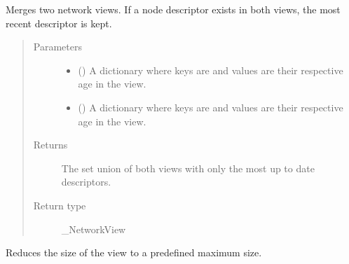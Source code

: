 \documentclass[letterpaper,10pt,english]{sphinxmanual}
\begin{document}
\begin{fulllineitems}
\begin{fulllineitems}
\label{\detokenize{app.domain:app.domain.network_nodes.NewscastNode._merge}}
Merges two network views. If a node descriptor exists in both
views, the most recent descriptor is kept.
\begin{quote}\begin{description}
\item[{Parameters}] \leavevmode\begin{itemize}
\item {} 
 () \textendash{} A dictionary where keys are {\hyperref[\detokenize{app.domain:app.domain.network_nodes.Node}]{}}
and values are their respective age in the view.

\item {} 
 () \textendash{} A dictionary where keys are {\hyperref[\detokenize{app.domain:app.domain.network_nodes.Node}]{}}
and values are their respective age in the view.

\end{itemize}

\item[{Returns}] \leavevmode
The set union of both views with only the most up to date
descriptors.

\item[{Return type}] \leavevmode
\_NetworkView

\end{description}\end{quote}

\end{fulllineitems}


\begin{fulllineitems}
\label{\detokenize{app.domain:app.domain.network_nodes.NewscastNode._select_view}}
Reduces the size of the view to a predefined maximum size.


\end{fulllineitems}
\end{fulllineitems}
\end{document}
